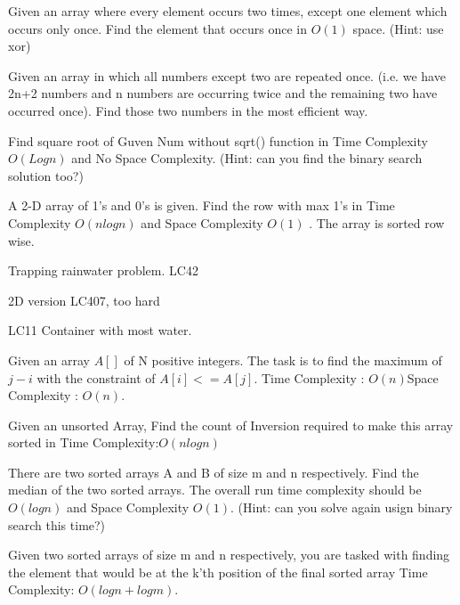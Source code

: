 {\begin{exercise}
\begin{compactenum}
\vspace{5pt}

\item Given an array where every element occurs two times, except one element which occurs only once. Find the element that occurs once in $O(1)$ space. (Hint: use xor)

\item Given an array in which all numbers except two are repeated once. (i.e. we have 2n+2 numbers and n numbers are occurring twice and the remaining two have occurred once). Find those two numbers in the most efficient way.
\item Find square root of Guven Num without sqrt() function in Time Complexity $O(Logn)$ and No Space Complexity. (Hint: can you find the binary search solution too?)
\item A 2-D array of 1's and 0's is given. Find the row with max 1's in Time Complexity $O(nlogn)$ and Space Complexity $O(1)$ . The array is sorted row wise.

\vspace{5pt}
\item Trapping rainwater problem. LC42
\begin{compactenum}
    \item 2D version LC407, too hard
    \item LC11 Container with most water.
\end{compactenum}

\vspace{3pt}
\item Given an array $A[]$ of N positive integers. The task is to find the maximum of $j - i$ with the constraint of $A[i] <= A[j]$. Time Complexity : $O(n)$Space Complexity : $O(n)$.

\item Given an unsorted Array, Find the count of Inversion required to make this array sorted in Time Complexity:$O(nlogn)$

\item There are two sorted arrays A and B of size m and n respectively. Find the median of the two sorted arrays. The overall run time complexity should be $O(log n)$ and Space Complexity $O(1)$. (Hint: can you solve again usign binary search this time?)

\item Given two sorted arrays of size m and n respectively, you are tasked with finding the element that would be at the k’th position of the final sorted array Time Complexity: $O(log n + log m)$.


\end{compactenum}
\end{exercise}}
